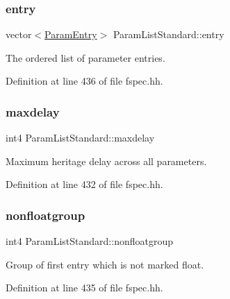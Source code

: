 \subsubsection{\texorpdfstring{entry}{entry}}
{\footnotesize\ttfamily vector$<$\mbox{\hyperlink{class_param_entry}{Param\+Entry}}$>$ Param\+List\+Standard\+::entry\hspace{0.3cm}{\ttfamily [protected]}}



The ordered list of parameter entries. 



Definition at line 436 of file fspec.\+hh.

\mbox{\label{class_param_list_standard_afe373fd5fb7807b7bba1d83649469cab}} 
\subsubsection{\texorpdfstring{maxdelay}{maxdelay}}
{\footnotesize\ttfamily int4 Param\+List\+Standard\+::maxdelay\hspace{0.3cm}{\ttfamily [protected]}}



Maximum heritage delay across all parameters. 



Definition at line 432 of file fspec.\+hh.

\mbox{\label{class_param_list_standard_a512864be48d391ee4903d0a38147438c}} 
\subsubsection{\texorpdfstring{nonfloatgroup}{nonfloatgroup}}
{\footnotesize\ttfamily int4 Param\+List\+Standard\+::nonfloatgroup\hspace{0.3cm}{\ttfamily [protected]}}



Group of first entry which is not marked float. 



Definition at line 435 of file fspec.\+hh.

\mbox{\label{class_param_list_standard_ae129a4db3bb767656a32daeffee806a5}} 

